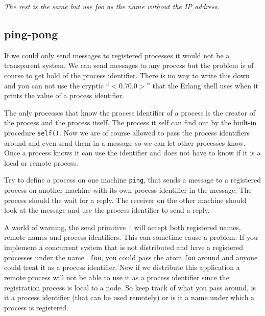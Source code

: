 \documentclass[a4paper, 11pt]{article}
\begin{document}
{\it The rest is the same but use foo as the name without the IP address.}

\subsection{ping-pong}

\noindent If we could only send messages to registered processes it
would not be a transparent system. We can send messages to any process
but the problem is of course to get hold of the process
identifier. There is no way to write this down and you can not use the
cryptic ``$<$0.70.0$>$'' that the Erlang shell uses when it prints the
value of a process identifier.

The only processes that know the process identifier of a process is
the creator of the process and the process itself. The process it self
can find out by the built-in procedure {\tt self()}. Now we are of
course allowed to pass the process identifiers around and even send
them in a message so we can let other processes know. Once a process
knows it can use the identifier and does not have to know if it is a
local or remote process.

Try to define a process on one machine {\tt ping}, that sends a
message to a registered process on another machine with its own
process identifier in the message. The process should the wait for a
reply. The receiver on the other machine should look at the message
and use the process identifier to send a reply.

A world of warning, the send primitive {\tt !} will accept both
registered names, remote names and process identifiers. This can
sometime cause a problem. If you implement a concurrent system that is
not distributed and have a registered processes under the name {\tt
foo}, you could pass the atom {\tt foo} around and anyone could treat
it as a process identifier. Now if we distribute this application a
remote process will not be able to use it as a process identifier
since the registration process is local to a node. So keep track of
what you pass around, is it a process identifier (that can be used
remotely) or is it a name under which a process is registered.
\end{document}
